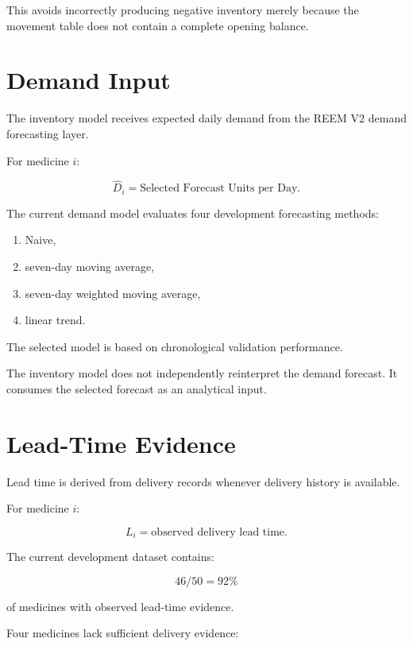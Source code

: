 \documentclass[11pt,a4paper]{article}
\begin{document}
This avoids incorrectly producing negative inventory merely because
the movement table does not contain a complete opening balance.

\section{Demand Input}

The inventory model receives expected daily demand from the REEM V2
demand forecasting layer.

For medicine $i$:

\[
\widehat{D}_i
=
\text{Selected Forecast Units per Day}.
\]

The current demand model evaluates four development forecasting
methods:

\begin{enumerate}
    \item Naive,
    \item seven-day moving average,
    \item seven-day weighted moving average,
    \item linear trend.
\end{enumerate}

The selected model is based on chronological validation performance.

The inventory model does not independently reinterpret the demand
forecast. It consumes the selected forecast as an analytical input.

\section{Lead-Time Evidence}

Lead time is derived from delivery records whenever delivery history
is available.

For medicine $i$:

\[
L_i =
\text{observed delivery lead time}.
\]

The current development dataset contains:

\[
46/50 = 92\%
\]

of medicines with observed lead-time evidence.

Four medicines lack sufficient delivery evidence:
\end{document}
